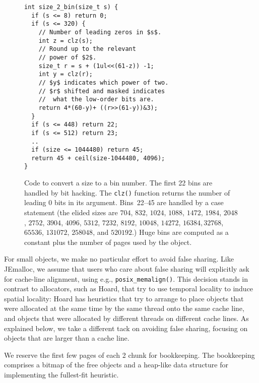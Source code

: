 \documentclass[pldi]{sigplanconf-pldi15}
\newcommand{\code}[1]{\texttt{#1}}
\newcommand{\bcknote}[1]{\cnote{red}{#1}{bck}}
\begin{document}
\begin{figure}
\begin{verbatim}
int size_2_bin(size_t s) {
  if (s <= 8) return 0;
  if (s <= 320) {
    // Number of leading zeros in $s$.
    int z = clz(s);
    // Round up to the relevant
    // power of $2$.
    size_t r = s + (1ul<<(61-z)) -1;
    int y = clz(r);
    // $y$ indicates which power of two.
    // $r$ shifted and masked indicates
    //  what the low-order bits are.
    return 4*(60-y)+ ((r>>(61-y))&3);
  }
  if (s <= 448) return 22;
  if (s <= 512) return 23;
  ..
  if (size <= 1044480) return 45;
  return 45 + ceil(size-1044480, 4096);
}
\end{verbatim}
\caption{Code to convert a size to a bin number.  The first 22 bins
  are handled by bit hacking. The \code{clz()} function returns the
  number of leading 0 bits in its argument. Bins~22--45 are handled by
  a case statement (the elided sizes are $704$, $832$, $1024$, $1088$,
  $1472$, $1984$, $2048$, $2752$, $3904$, $4096$, $5312$, $7232$,
  $8192$, $10048$, $14272$, $16384, 32768$, $65536$, $131072$,
  $258048$, and $520192$.)  Huge bins are computed as a constant plus
  the number of pages used by the object.}
\label{fig:size2bin}
\end{figure}

For small objects, we make no particular effort to avoid false
sharing.  Like JEmalloc, we assume that users who care about false
sharing will explicitly ask for cache-line alignment, using e.g.,
\code{posix_memalign()}.  This decision stands in contrast to
allocators, such as Hoard, that try to use temporal locality to induce
spatial locality: Hoard has heuristics that try to arrange to place
objects that were allocated at the same time by the same thread onto
the same cache line, and objects that were allocated by different
threads on different cache lines.  As explained below, we take a
different tack on avoiding false sharing, focusing on objects that are
larger than a cache line.

We reserve the first few pages of each \unit{2}\mebi\byte{} chunk for
bookkeeping.  The bookkeeping comprises a bitmap of the free objects
and a heap-like data structure for implementing the fullest-fit
heuristic. %

\end{document}
